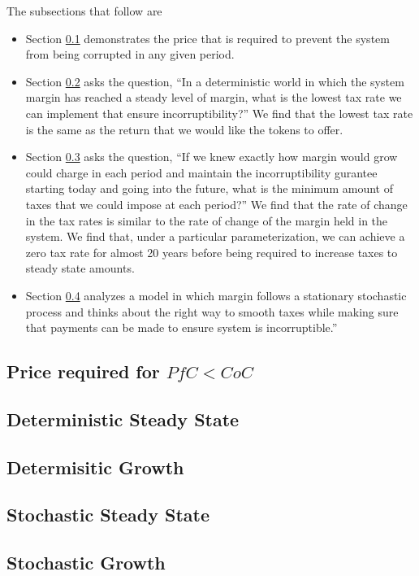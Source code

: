 \documentclass[12pt]{article}
\begin{document}
  The subsections that follow are

  \begin{itemize}
    \item Section \ref{sec:price_required} demonstrates the price that is required to prevent the
          system from being corrupted in any given period.
    \item Section \ref{sec:dss} asks the question, ``In a deterministic world in which the system
          margin has reached a steady level of margin, what is the lowest tax rate we can implement
          that ensure incorruptibility?'' We find that the lowest tax rate is the same as the return
          that we would like the tokens to offer.
    \item Section \ref{sec:dg} asks the question, ``If we knew exactly how margin would grow
          could charge in each period and maintain the incorruptibility gurantee starting today and
          going into the future, what is the minimum amount of taxes that we could impose at each
          period?'' We find that the rate of change in the tax rates is similar to the rate of
          change of the margin held in the system. We find that, under a particular
          parameterization, we can achieve a zero tax rate for almost 20 years before being required
          to increase taxes to steady state amounts.
    \item Section \ref{sec:sss} analyzes a model in which margin follows a stationary stochastic
          process and thinks about the right way to smooth taxes while making sure that payments
          can be made to ensure system is incorruptible.''
  \end{itemize}

  \subsection{Price required for $PfC < CoC$} \label{sec:price_required}
    

  \subsection{Deterministic Steady State} \label{sec:dss}
    

  \subsection{Determisitic Growth} \label{sec:dg}
    

  \subsection{Stochastic Steady State} \label{sec:sss}
    

  \subsection{Stochastic Growth} \label{sec:sg}
\end{document}
